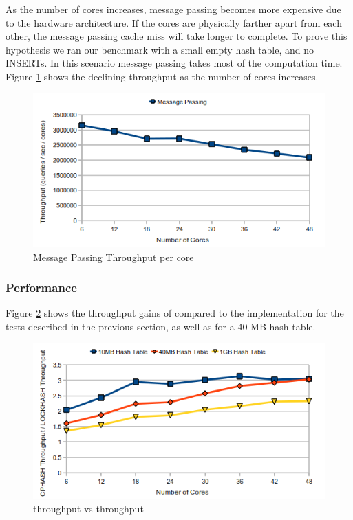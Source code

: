 As the number of cores increases, message passing becomes more expensive due to the hardware architecture. If the cores are physically farther apart from each 
other, the message passing cache miss will take longer to complete. To prove this hypothesis we ran our benchmark with a small empty hash table, and no INSERTs. 
In this scenario message passing takes most of the computation time. Figure \ref{fig:scalemp} shows the declining throughput as the number of cores increases.

\begin{figure}[!ht]
  \centering
  \includegraphics[width=\linewidth]{figs/scalemp.png}
  \caption{Message Passing Throughput per core}
  \label{fig:scalemp}
\end{figure}

\subsubsection{Performance}

Figure \ref{fig:cphashspeedup} shows the throughput gains of \cphash{} compared to the \lockhash{} implementation for the tests described in 
the previous section, as well as for a 40 MB hash table.

\begin{figure}[!ht]
  \centering
  \includegraphics[width=\linewidth]{figs/cphashspeedup.png}
  \caption{\cphash{} throughput vs \lockhash{} throughput}
  \label{fig:cphashspeedup}
\end{figure}

